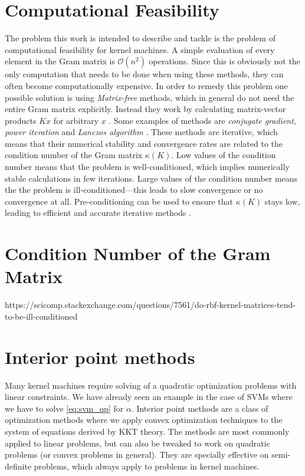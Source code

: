 \documentclass{article}
\theoremstyle{plain}
\theoremstyle{definition}
\theoremstyle{remark}
\begin{document}
\section{Computational Feasibility}
The problem this work is intended to describe and tackle is the problem of computational feasibility for kernel machines. A simple evaluation of every element in the Gram matrix is $\mathcal{O}(n^2)$ operations. Since this is obviously not the only computation that needs to be done when using these methods, they can often become computationally expensive. In order to remedy this problem one possible solution is using \textit{Matrix-free} methods, which in general do not need the entire Gram matrix explicitly. Instead they work by calculating matrix-vector products $Kx$ for arbitrary $x$ \cite{davies}. Some examples of methods are \textit{conjugate gradient}, \textit{power iteration} and \textit{Lanczos algorithm} \cite{wiki:Matrix-free_methods}. These methods are iterative, which means that their numerical stability and convergence rates are related to the condition number of the Gram matrix $\kappa(K)$. Low values of the condition number means that the problem is well-conditioned, which implies numerically stable calculations in few iterations. Large values of the condition number means the the problem is ill-conditioned—this leads to slow convergence or no convergence at all. Pre-conditioning can be used to ensure that $\kappa(K)$ stays low, leading to efficient and accurate iterative methods \cite{davies}.

\section{Condition Number of the Gram Matrix}

https://scicomp.stackexchange.com/questions/7561/do-rbf-kernel-matrices-tend-to-be-ill-conditioned


\section{Interior point methods}
Many kernel machines require solving of a quadratic optimization problems with linear constraints. 
We have already seen an example in the case of SVMs where we have to solve \ref{eq:svm_qp} for $\alpha$.
Interior point methods are a class of optimization methods where we apply convex optimization techniques to the system of equations derived by KKT theory.
The methods are most commonly applied to linear problems, but can also be tweaked to work on quadratic problems (or convex problems in general).
They are specially effective on semi-definite problems, which always apply to problems in kernel machines.
\end{document}
